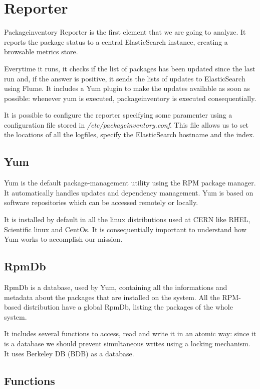\section{Reporter}

Packageinventory Reporter is the first element that we are going to
analyze. It reports the package status to a central ElasticSearch
instance, creating a browsable metrics store.

Everytime it runs, it checks if the list of packages has been updated
since the last run and, if the answer is positive, it sends the lists of
updates to ElasticSearch using Flume. It includes a Yum plugin to make the
updates available as soon as possible: whenever yum is executed,
packageinventory is executed consequentially.

It is possible to configure the reporter specifying some paramenter using
a configuration file stored in \textit{/etc/packageinventory.conf}. This
file allows us to set the locations of all the logfiles, specify the
ElasticSearch hostname and the index.

\subsection{Yum}

Yum is the default package-management utility using the RPM package
manager. It automatically handles updates and dependency management. Yum
is based on software repositories which can be accessed remotely or
locally.

It is installed by default in all the linux distributions used at CERN
like RHEL, Scientific linux and CentOs. It is consequentially important to
understand how Yum works to accomplish our mission.

\subsection{RpmDb}

RpmDb is a database, used by Yum, containing all the informations and
metadata about the packages that are installed on the system. All the
RPM-based distribution have a global RpmDb, listing the packages of the
whole system.

It includes several functions to access, read and write it in an atomic
way: since it is a database we should prevent simultaneous writes using
a locking mechanism. It uses Berkeley DB (BDB) as a database.

\subsection{Functions}

